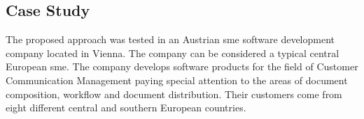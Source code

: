 %
%
%
%
%

\subsection{Case Study}

The proposed approach was tested in an Austrian \gls{sme} software development company located in Vienna. The company can be considered a typical central European \gls{sme}. The company develops software products for the field of Customer Communication Management paying special attention to the areas of document composition, workflow and document distribution. Their customers come from eight different central and southern European countries. 

